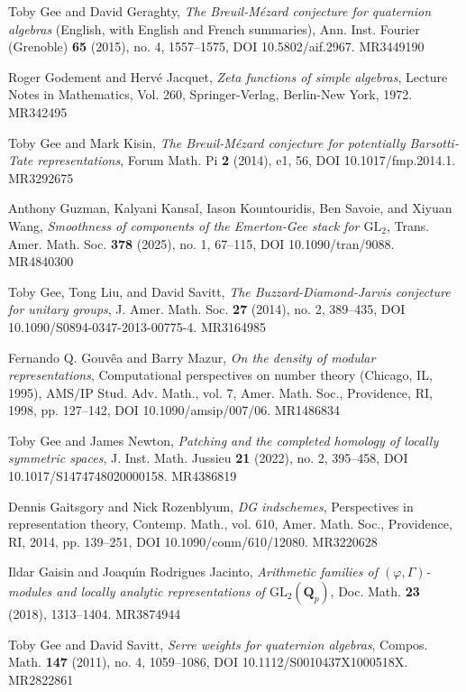 \item[{[GG15]}] Toby Gee and David Geraghty, \emph{The Breuil-M\'ezard conjecture for quaternion algebras} (English, with English and French summaries), Ann. Inst. Fourier (Grenoble) \textbf{65} (2015), no. 4, 1557--1575, DOI 10.5802/aif.2967. MR3449190
\item[{[GJ72]}] Roger Godement and Herv\'e Jacquet, \emph{Zeta functions of simple algebras}, Lecture Notes in Mathematics, Vol. 260, Springer-Verlag, Berlin-New York, 1972. MR342495
\item[{[GK14]}] Toby Gee and Mark Kisin, \emph{The Breuil-M\'ezard conjecture for potentially Barsotti-Tate representations}, Forum Math. Pi \textbf{2} (2014), e1, 56, DOI 10.1017/fmp.2014.1. MR3292675
\item[{[GKK+25]}] Anthony Guzman, Kalyani Kansal, Iason Kountouridis, Ben Savoie, and Xiyuan Wang, \emph{Smoothness of components of the Emerton-Gee stack for $\mathrm{GL}_2$}, Trans. Amer. Math. Soc. \textbf{378} (2025), no. 1, 67--115, DOI 10.1090/tran/9088. MR4840300
\item[{[GLS14]}] Toby Gee, Tong Liu, and David Savitt, \emph{The Buzzard-Diamond-Jarvis conjecture for unitary groups}, J. Amer. Math. Soc. \textbf{27} (2014), no. 2, 389--435, DOI 10.1090/S0894-0347-2013-00775-4. MR3164985
\item[{[GM98]}] Fernando Q. Gouv\^ea and Barry Mazur, \emph{On the density of modular representations}, Computational perspectives on number theory (Chicago, IL, 1995), AMS/IP Stud. Adv. Math., vol. 7, Amer. Math. Soc., Providence, RI, 1998, pp. 127--142, DOI 10.1090/amsip/007/06. MR1486834
\item[{[GN22]}] Toby Gee and James Newton, \emph{Patching and the completed homology of locally symmetric spaces}, J. Inst. Math. Jussieu \textbf{21} (2022), no. 2, 395--458, DOI 10.1017/S1474748020000158. MR4386819
\item[{[GR11]}] Dennis Gaitsgory and Nick Rozenblyum, \emph{DG indschemes}, Perspectives in representation theory, Contemp. Math., vol. 610, Amer. Math. Soc., Providence, RI, 2014, pp. 139--251, DOI 10.1090/conm/610/12080. MR3220628
\item[{[GRJ18]}] Ildar Gaisin and Joaqu\'{\i}n Rodrigues Jacinto, \emph{Arithmetic families of $(\varphi,\Gamma)$-modules and locally analytic representations of $\mathrm{GL}_2(\mathbf{Q}_p)$}, Doc. Math. \textbf{23} (2018), 1313--1404. MR3874944
\item[{[GS11]}] Toby Gee and David Savitt, \emph{Serre weights for quaternion algebras}, Compos. Math. \textbf{147} (2011), no. 4, 1059--1086, DOI 10.1112/S0010437X1000518X. MR2822861
